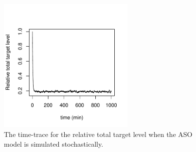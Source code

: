 \documentclass[a4paper,11pt]{article}
\newenvironment{Ncenter}{%
  \setlength\topsep{-10pt}
  \setlength\parskip{-100pt}
  \begin{center}
}{%
  \end{center}
}
\begin{document}
\begin{figure}[!h]
\begin{Ncenter}
\includegraphics[width=0.6\textwidth]{SuppFile1-Trel.pdf}
\end{Ncenter}
\caption{The time-trace for the relative total target level when the ASO model is simulated stochastically.}\label{fig:Trel}
\end{figure}
\end{document}
